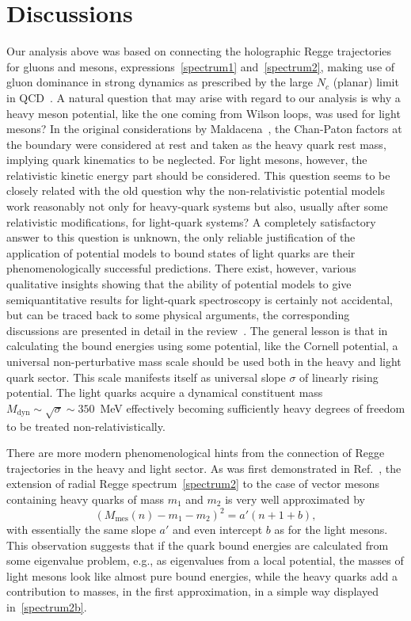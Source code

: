 \documentclass[a4paper,11pt]{article}
\begin{document}
\section{Discussions}

Our analysis above was based on connecting the holographic Regge trajectories for gluons and mesons, expressions~\eqref{spectrum1} and~\eqref{spectrum2}, making use of gluon dominance in strong dynamics as prescribed by the large $N_c$ (planar) limit in QCD~\cite{hoof,wit}. A natural question that may arise with regard to our analysis is why a heavy meson potential, like the one coming from Wilson loops, was used for light mesons? In the original considerations by Maldacena~\cite{Maldacena:1998im}, the Chan-Paton factors at the boundary were considered at rest and taken as the heavy quark rest mass, implying quark kinematics to be neglected. For light mesons, however, the relativistic kinetic energy part should be considered.
This question seems to be closely related with the old question why the non-relativistic potential models work reasonably not only for heavy-quark systems
but also, usually after some relativistic modifications, for light-quark systems? A completely satisfactory answer to this question is unknown, the only reliable justification of the
application of potential models to bound states of light quarks are their phenomenologically successful predictions. There exist, however, various qualitative
insights showing that the ability of potential models to give semiquantitative results for light-quark spectroscopy is certainly not accidental, but can be traced back
to some physical arguments, the corresponding discussions are presented in detail in the review~\cite{Lucha}. The general lesson is that in calculating
the bound energies using some potential, like the Cornell potential, a universal non-perturbative mass scale should be used both in the heavy and light quark sector.
This scale manifests itself as universal slope $\sigma$ of linearly rising potential. The light quarks acquire a dynamical constituent mass $M_\text{dyn}\sim\sqrt{\sigma}\sim350$~MeV
effectively becoming sufficiently heavy degrees of freedom to be treated non-relativistically.

There are more modern phenomenological hints from the connection of Regge trajectories in the heavy and light sector.
As was first demonstrated in Ref.~\cite{Afonin:2014nya}, the extension of radial Regge spectrum~\eqref{spectrum2}
to the case of vector mesons containing heavy quarks of mass $m_1$ and $m_2$ is very well approximated by
\begin{equation}
\label{spectrum2b}
  \left(M_\text{mes}(n)-m_1-m_2\right)^2=a'(n+1+b),
\end{equation}
with essentially the same slope $a'$ and even intercept $b$ as for the light mesons. This observation suggests that
if the quark bound energies are calculated from some eigenvalue problem, e.g., as eigenvalues from a local potential,
the masses of light mesons look like almost pure bound energies, while the heavy quarks add a contribution to masses,
in the first approximation, in a simple way displayed in~\eqref{spectrum2b}.
\end{document}
